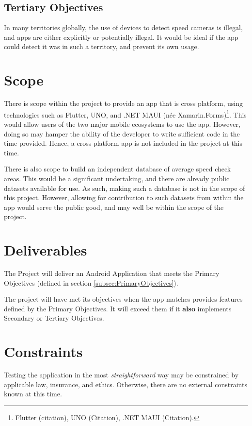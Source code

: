 \documentclass[11pt, a4paper, notitlepage]{report}
\begin{document}
\subsection{Tertiary Objectives}
In many territories globally, the use of devices to detect speed cameras is 
illegal, and apps are either explicitly or potentially illegal. It would be 
ideal if the app could detect it was in such a territory, and prevent its own 
usage.

\section{Scope}\label{sec:Scope}
There is scope within the project to provide an app that is cross platform, 
using technologies such as Flutter, UNO, and .NET MAUI (née 
Xamarin.Forms)\footnote{Flutter (citation), UNO (Citation), .NET MAUI 
(Citation).}. This would allow users of the two major mobile ecosystems to use 
the app. However, doing so may hamper the ability of the developer to write 
sufficient code in the time provided. Hence, a cross-platform app is not 
included in the project at this time.

There is also scope to build an independent database of average speed check 
areas. This would be a significant undertaking, and there are already public 
datasets available for use. As such, making such a database is not in the scope 
of this project. However, allowing for contribution to such datasets from 
within the app would serve the public good, and may well be within the scope of 
the project.

\section{Deliverables}
The Project will deliver an Android Application that meets the Primary 
Objectives (defined in section \ref{subsec:PrimaryObjectives}).

The project will have met its objectives when the app matches provides features 
defined by the Primary Objectives. It will exceed them if it \textbf{also} 
implements Secondary or Tertiary Objectives.

\section{Constraints}
Testing the application in the most \textit{straightforward} way may be 
constrained by applicable law, insurance, and ethics. Otherwise, there are no 
external constraints known at this time.
\end{document}
